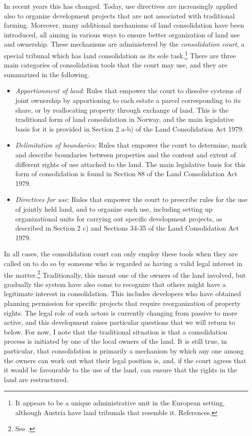 In recent years this has changed. Today, use directives are increasingly applied also to organize development projects that are not associated with traditional farming. Moreover, many additional mechanisms of land consolidation have been introduced, all aiming in various ways to ensure better organization of land use and ownership. These mechanisms are administered by the \emph{consolidation court}, a special tribunal which has land consolidation as its sole task.\footnote{It appears to be a unique administrative unit in the European setting, although Austria have land tribunals that resemble it. References.} There are three main categories of consolidation tools that the court may use, and they are summarized in the following.

\begin{itemize}
\item \emph{Apportionment of land}: Rules that empower the court to dissolve systems of joint ownership by apportioning to each estate a parcel corresponding to its share, or by reallocating property through exchange of land. This is the traditional form of land consolidation in Norway, and the main legislative basis for it is provided in Section 2 a-b) of the Land Consolidation Act 1979.
\item \emph{Delimitation of boundaries:} Rules that empower the court to determine, mark and describe boundaries between properties and the content and extent of different rights of use attached to the land. The main legislative basis for this form of consolidation is found in Section 88 of the Land Consolidation Act 1979.
\item \emph{Directives for use}: Rules that empower the court to prescribe rules for the use of jointly held land, and to organize such use, including setting up organizational units for carrying out specific development projects, as described in Section 2 c) and Sections 34-35 of the Land Consolidation Act 1979. 
\end{itemize}

In all cases, the consolidation court can only employ these tools when they are called on to do so by someone who is regarded as having a valid legal interest in the matter.\footnote{See \cite[5]{lca79}.} Traditionally, this meant one of the owners of the land involved, but gradually the system have also come to recognize that others might have a legitimate interest in consolidation. This includes developers who have obtained planning permission for specific projects that require reorganization of property rights. The legal role of such actors is currently changing from passive to more active, and this development raises particular questions that we will return to below. For now, I note that the traditional situation is that a consolidation process is initiated by one of the local owners of the land. It is still true, in particular, that consolidation is primarily a mechanism by which any one among the owners can work out what their legal position is, and, if the court agrees that it would be favourable to the use of the land, can ensure that the rights in the land are restructured.

